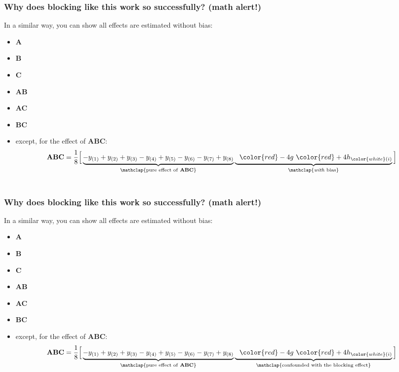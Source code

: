 \begin{frame}\frametitle{Why does blocking like this work so successfully? (math alert!)}
	
	\vspace{1cm}
	In a similar way, you can show all effects are estimated without bias:
	\begin{itemize}
		\item	\textbf{A}
		\item	\textbf{B}
		\item	\textbf{C}
		\item	\textbf{AB}
		\item	\textbf{AC}
		\item	\textbf{BC}
		
		\vspace{1cm}
		\item	except, for the effect of \textbf{ABC}:
			\begin{align*}
			\mathbf{ABC} &= \dfrac{1}{8} \Big[  \underbrace{-y_{(1)} + y_{(2)} +  y_{(3)} - y_{(4)} + y_{(5)} - y_{(6)} - y_{(7)} + y_{(8)}}_{\mathclap{\text{pure effect of \textbf{ABC}}}} \underbrace{\,\,\,\,{\color{red}-4g} \,\, {\color{red}+ 4h_{\color{white}(i)}}}_{\mathclap{\text{\emph{with} bias}}}	 \Big]\\	
			\\
			\end{align*}
	\end{itemize}
\end{frame}

\begin{frame}\frametitle{Why does blocking like this work so successfully? (math alert!)}
	
	\vspace{1cm}
	In a similar way, you can show all effects are estimated without bias:
	\begin{itemize}
		\item	\textbf{A}
		\item	\textbf{B}
		\item	\textbf{C}
		\item	\textbf{AB}
		\item	\textbf{AC}
		\item	\textbf{BC}
		
		\vspace{1cm}
		\item	except, for the effect of \textbf{ABC}:
			\begin{align*}
			\mathbf{ABC} &= \dfrac{1}{8} \Big[  \underbrace{-y_{(1)} + y_{(2)} +  y_{(3)} - y_{(4)} + y_{(5)} - y_{(6)} - y_{(7)} + y_{(8)}}_{\mathclap{\text{pure effect of \textbf{ABC}}}} \underbrace{\,\,\,\,{\color{red}-4g} \,\, {\color{red}+ 4h_{\color{white}(i)}}}_{\mathclap{\text{confounded with the blocking effect}}}	 \Big]\\	
			\\
			\end{align*}
	\end{itemize}
\end{frame}

